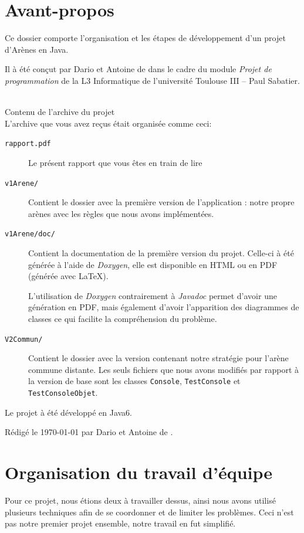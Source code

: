 \documentclass[12pt,a4paper,openany]{book}
\begin{document}
	\thispagestyle{empty} %
	\titleBC 
	\setcounter{tocdepth}{2}
	\setcounter{secnumdepth}{3}
	\newpage
	\chapter*{Avant-propos}
	Ce dossier comporte l'organisation et les étapes de développement d'un projet d'Arènes en Java. 

	Il à été conçut par Dario  et Antoine de  dans le cadre du module \textit{Projet de programmation} de la L3
	Informatique de l'université Toulouse III -- Paul Sabatier.\\~

	\large{\sectionfont Contenu de l'archive du projet}\\
	\normalsize
	L'archive que vous avez reçus était organisée comme ceci: 
	\begin{description}
		\item[\texttt{rapport.pdf}] Le présent rapport que vous êtes en train de lire
		\item[\texttt{v1Arene/}] Contient le dossier avec la première version de l'application : notre propre arènes avec les règles que nous avons implémentées. 
		\item[\texttt{v1Arene/doc/}] Contient la documentation de la première version du projet. Celle-ci à été générée à l'aide de \textit{Doxygen}, elle
			est disponible en HTML ou en PDF (générée avec \LaTeX).

			L'utilisation de \textit{Doxygen} contrairement à \textit{Javadoc} permet d'avoir une génération en PDF, mais également d'avoir l'apparition des diagrammes de
			classes ce qui facilite la compréhension du problème.
		\item[\texttt{V2Commun/}] Contient le dossier avec la version contenant notre stratégie pour l'arène commune distante. Les seuls fichiers que nous avons
			modifiés par rapport à la version de base sont les classes \texttt{Console}, \texttt{TestConsole} et \texttt{TestConsoleObjet}.
	\end{description}

	Le projet à été développé en Java6.

	\vfill
	\footnotesize Rédigé le \today{} par Dario  et Antoine de .
	\tableofcontents
	\chapter{Organisation du travail d'équipe}
	Pour ce projet, nous étions deux à travailler dessus, ainsi nous avons utilisé plusieurs techniques afin de se coordonner et de limiter les problèmes. Ceci
	n'est pas notre premier projet ensemble, notre travail en fut simplifié.
\end{document}
